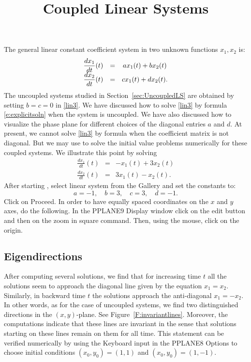 \documentclass{ximera}
\title{Coupled Linear Systems}
\begin{document}
\begin{abstract}
\end{abstract}
\maketitle

 \label{s:3.5}


The general linear constant coefficient system in two unknown functions 
$x_1,x_2$ is:
\renewcommand{\arraystretch}{1.8}
\begin{equation}\label{lin3}
\begin{array}{ccc}
\displaystyle \frac{dx_1}{dt}(t) & = & ax_1(t) + bx_2(t) \\
\displaystyle \frac{dx_2}{dt}(t) & = & cx_1(t) + dx_2(t).
\end{array}
\end{equation}
\renewcommand{\arraystretch}{1.0}%
The uncoupled systems studied in Section~\ref{sec:UncoupledLS} are obtained 
by setting $b=c=0$ in \eqref{lin3}.  We have discussed how to solve \eqref{lin3} 
by formula \eqref{e:explicitsoln} when the system is uncoupled.  We have also 
discussed how to visualize the phase plane for different choices of the 
diagonal entries $a$ and $d$.  At present, we cannot
solve \eqref{lin3} by formula when the coefficient matrix is not diagonal.
But we may use {\pplane} to solve the initial value problems numerically 
for these coupled systems.  We illustrate this point by solving
\begin{eqnarray*}
\frac{dx_1}{dt}(t) & = &  -x_1(t) + 3x_2(t) \\
\frac{dx_2}{dt}(t) & = &  3x_1(t) - x_2(t).
\end{eqnarray*}
After starting {\pplane}, select {\sf linear system} from the
{\sf Gallery} and set the constants to:
\[
	a = -1,\quad b = 3,\quad c = 3, \quad d = -1.
\]
Click on {\sf Proceed}.  In order to have equally spaced coordinates on
the $x$ and $y$ axes, do the following.   In the {\sf PPLANE9 Display} 
window click on the {\sf edit} button and then on the {\sf zoom in square} 
command.  Then, using the mouse, click on the origin.

\subsection*{Eigendirections}

After computing several solutions, we find that for increasing
time $t$ all the solutions seem to approach the diagonal line
given by the equation $x_1=x_2$. Similarly, in backward time $t$
the solutions approach the anti-diagonal $x_1=-x_2$.  In other
words, as for the case of uncoupled systems, we find two
distinguished directions in the $(x,y)$-plane.  See
Figure~\ref{F:invariantlines}.  Moreover, the computations
indicate that these lines are invariant in the sense that
solutions starting on these lines remain on them for all time.
This statement can be verified numerically by using the {\sf
Keyboard input} in the {\sf PPLANE8 Options} to choose initial
conditions $(x_0,y_0)=(1,1)$ and $(x_0,y_0)=(1,-1)$.
\end{document}
